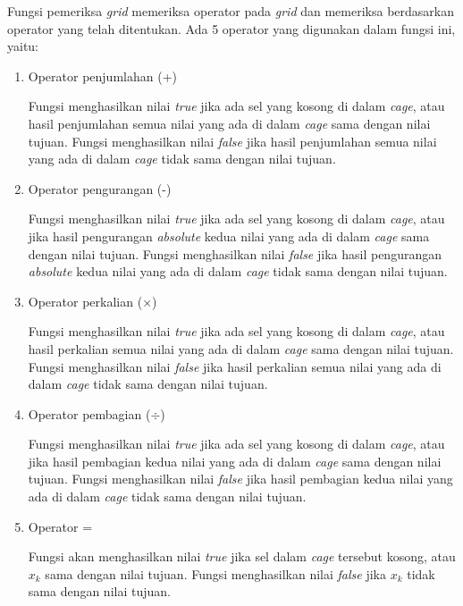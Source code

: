 Fungsi pemeriksa \textit{grid} memeriksa operator pada \textit{grid} dan memeriksa berdasarkan operator yang telah ditentukan. Ada 5 operator yang digunakan dalam fungsi ini, yaitu:

\begin{enumerate}
\item Operator penjumlahan (+)

Fungsi menghasilkan nilai \textit{true} jika ada sel yang kosong di dalam \textit{cage}, atau hasil penjumlahan semua nilai yang ada di dalam \textit{cage} sama dengan nilai tujuan. Fungsi menghasilkan nilai \textit{false} jika hasil penjumlahan semua nilai yang ada di dalam \textit{cage} tidak sama dengan nilai tujuan.
\item Operator pengurangan (-)

Fungsi menghasilkan nilai \textit{true} jika ada sel yang kosong di dalam \textit{cage}, atau jika hasil pengurangan \textit{absolute} kedua nilai yang ada di dalam \textit{cage} sama dengan nilai tujuan. Fungsi menghasilkan nilai \textit{false} jika hasil pengurangan \textit{absolute} kedua nilai yang ada di dalam \textit{cage} tidak sama dengan nilai tujuan.
\item Operator perkalian (\begin{math}\times\end{math})

Fungsi menghasilkan nilai \textit{true} jika ada sel yang kosong di dalam \textit{cage}, atau hasil perkalian semua nilai yang ada di dalam \textit{cage} sama dengan nilai tujuan. Fungsi menghasilkan nilai \textit{false}  jika hasil perkalian semua nilai yang ada di dalam \textit{cage} tidak sama dengan nilai tujuan.
\item Operator pembagian (\begin{math}\div\end{math})

Fungsi menghasilkan nilai \textit{true} jika ada sel yang kosong di dalam \textit{cage}, atau jika hasil pembagian kedua nilai yang ada di dalam \textit{cage} sama dengan nilai tujuan. Fungsi menghasilkan nilai \textit{false} jika hasil pembagian kedua nilai yang ada di dalam \textit{cage} tidak sama dengan nilai tujuan.
\item Operator =

Fungsi akan menghasilkan nilai \textit{true} jika sel dalam \textit{cage} tersebut kosong, atau \begin{math}x_k\end{math} sama dengan nilai tujuan. Fungsi menghasilkan nilai \textit{false} jika \begin{math}x_k\end{math} tidak sama dengan nilai tujuan.
\end{enumerate}

